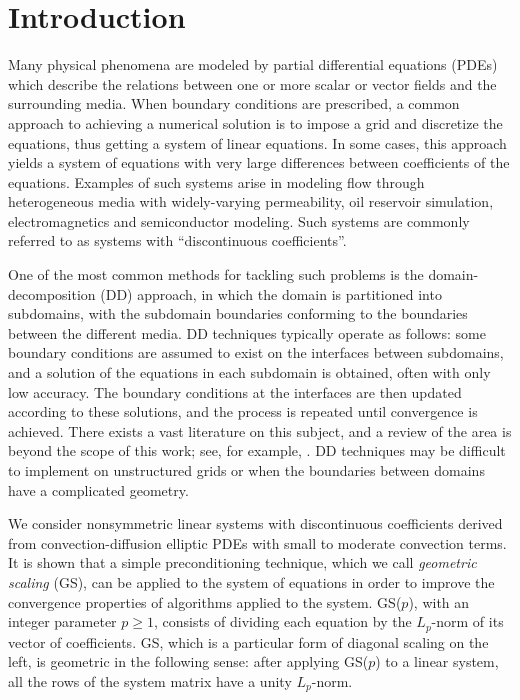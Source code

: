 \documentclass[12pt,a4paper]{article}
\newcounter{i}
\begin{document}
\section{Introduction}

Many physical phenomena are modeled by partial differential equations 
(PDEs) which describe the relations between one or more scalar or vector 
fields and the surrounding media.  When boundary conditions are prescribed, 
a common approach to achieving a numerical solution is to impose a grid 
and discretize the equations, thus getting a system of linear equations.  
In some cases, this approach yields a system of equations with very large 
differences between coefficients of the equations.  Examples of such 
systems arise in modeling flow through heterogeneous media with 
widely-varying permeability, oil reservoir simulation, electromagnetics 
and semiconductor modeling.  Such systems are commonly referred to as 
systems with ``discontinuous coefficients''.  

One of the most common methods for tackling such problems is 
the domain-decomposition (DD) approach, in which the domain 
is partitioned into subdomains, with the subdomain boundaries 
conforming to the boundaries between the different media.  
DD techniques typically operate as follows: some boundary 
conditions are assumed to exist on the interfaces between 
subdomains, and a solution of the equations in each subdomain 
is obtained, often with only low accuracy.  The boundary 
conditions at the interfaces are then updated according to 
these solutions, and the process is repeated until convergence 
is achieved.  There exists a vast literature on this subject, 
and a review of the area is beyond the scope of this work; 
see, for example, \cite{Glowinski88,Smith96,Quarteroni99,Rice00}.  
DD techniques may be difficult to implement on unstructured 
grids or when the boundaries between domains have a 
complicated geometry.

We consider nonsymmetric linear systems with discontinuous 
coefficients derived from convection-diffusion elliptic PDEs 
with small to moderate convection terms.  It is shown that a 
simple preconditioning technique, which we call {\em geometric 
scaling} (GS), can be applied to the system of equations in 
order to improve the convergence properties of algorithms
applied to the system.  GS($p$), with an integer parameter 
$p\ge 1$, consists of dividing each equation by the $L_p$-norm 
of its vector of coefficients.  GS, which is a particular form 
of diagonal scaling on the left, is geometric in the following
sense: after applying GS($p$) to a linear system, all the rows
of the system matrix have a unity $L_p$-norm.
\end{document}
